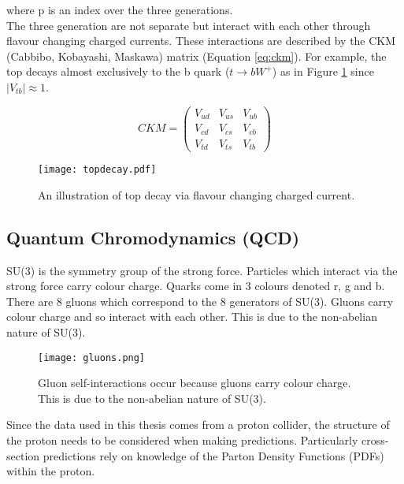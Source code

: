 where p is an index over the three generations. \\

The three generation are not separate but interact with each other through
flavour changing charged currents. These interactions are described by the CKM 
(Cabbibo, Kobayashi, Maskawa) matrix (Equation \ref{eq:ckm}). For example, the 
top decays almost exclusively to the b quark ($t\rightarrow bW^{+}$) as in 
Figure \ref{fig:topdecay} since $|V_{tb}| \approx 1$.

\begin{equation}
CKM = \left( 
\begin{array}{ccc}
V_{ud} & V_{us} & V_{ub} \\
V_{cd} & V_{cs} & V_{cb} \\
V_{td} & V_{ts} & V_{tb} 
\end{array} 
\right) 
\label{eq:ckm}
\end{equation}

\begin{figure}
\begin{center}
\texttt{[image: topdecay.pdf]}
\end{center}
\caption{An illustration of top decay via flavour changing charged current.}
\label{fig:topdecay}
\end{figure}

\subsection{Quantum Chromodynamics (QCD)}

SU(3) is the symmetry group of the strong force. Particles which interact via
the strong force carry colour charge. Quarks come in 3 colours denoted r, g and 
b. There are 8 gluons which correspond to the 8 generators of SU(3). Gluons 
carry colour charge and so interact with each other. This is due to the 
non-abelian nature of SU(3). \\

\begin{figure}
\begin{center}
\texttt{[image: gluons.png]}
\end{center}
\caption{Gluon self-interactions occur because gluons carry colour charge. This
is due to the non-abelian nature of SU(3).}
\end{figure}

Since the data used in this thesis comes from a proton collider, the structure
of the proton needs to be considered when making predictions. Particularly
cross-section predictions rely on knowledge of the Parton Density Functions
(PDFs) within the proton. \\

